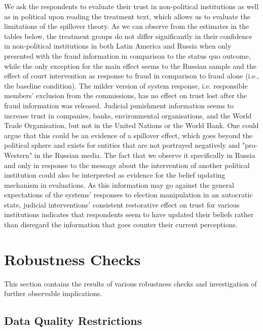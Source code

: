 \documentclass[11pt, ngerman,english,a4]{article}
\begin{document}
We ask the respondents to evaluate their trust in non-political institutions as well as in political upon reading the treatment text, which allows us to evaluate the limitations of the spillover theory. As we can observe from the estimates in the tables below, the treatment groups do not differ significantly in their confidence in non-political institutions in both Latin America and Russia when only presented with the fraud information in comparison to the status quo outcome,  while the only exception for the main effect seems to the Russian sample and the effect of court intervention as response to fraud in comparison to fraud alone (i.e., the baseline condition).
The milder version of system response, i.e. responsible members' exclusion from the commissions, has no effect on trust lost after the fraud information was released.
Judicial punishment information seems to increase trust in companies, banks, environmental organisations, and the World Trade Organisation, but not in the United Nations or the World Bank. One could argue that this could be an evidence of a spillover effect, which goes beyond the political sphere and exists for entities that are not portrayed negatively and "pro-Western" in the Russian media. The fact that we observe it specifically in Russia and only in response to the message about the intervention of another political institution could also be interpreted as evidence for the belief updating mechanism in evaluations. As this information may go against the general expectations of the systems' responses to election manipulation in an autocratic state, judicial interventions' consistent restorative effect on trust for various institutions indicates that respondents seem to have updated their beliefs rather than disregard the information that goes counter their current perceptions. 





\normalsize

\clearpage
\section*{Robustness Checks}

This section contains the results of various robustness checks and investigation of further observable implications.

\subsection*{Data Quality Restrictions}
\end{document}
